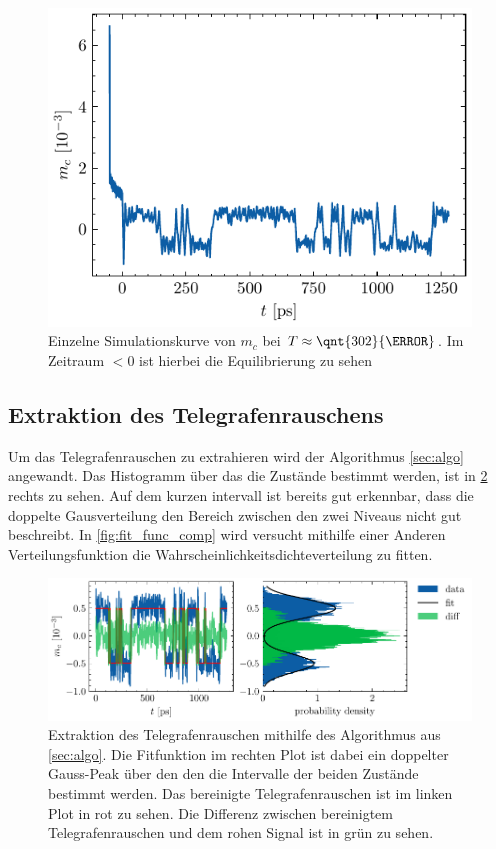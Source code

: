 \documentclass[main.tex]{subfiles}
\begin{document}
\begin{figure}[h]
    \centering
    \includegraphics{bilder/plots/theo-vis/example-telegraph-sim.pdf}
    \caption{Einzelne Simulationskurve von \(m_c\) bei \(T \approx \qnt{302}{\kelvin}\). Im Zeitraum \(<0\) ist hierbei die Equilibrierung zu sehen
    }\label{fig:bsp-run}
\end{figure}

\subsection{Extraktion des Telegrafenrauschens}

Um das Telegrafenrauschen zu extrahieren wird der Algorithmus \cref{sec:algo} angewandt.
Das Histogramm über das die Zustände bestimmt werden, ist in \cref{fig:extraktion-tgr} rechts zu sehen. Auf dem kurzen intervall ist bereits gut erkennbar, dass die doppelte Gausverteilung den Bereich zwischen den zwei Niveaus nicht gut beschreibt. In \cref{fig:fit_func_comp} wird versucht mithilfe einer Anderen Verteilungsfunktion die Wahrscheinlichkeitsdichteverteilung zu fitten.

\begin{figure}[H]
    \centering
    \includegraphics{bilder/plots/Bz_0mT/mc_fit_hist_part2_26.03meV.pdf}
    \caption{Extraktion des Telegrafenrauschen mithilfe des Algorithmus aus \cref{sec:algo}. Die Fitfunktion im rechten Plot ist dabei ein doppelter Gauss-Peak über den den die Intervalle der beiden Zustände bestimmt werden. Das bereinigte Telegrafenrauschen ist im linken Plot in rot zu sehen. Die Differenz zwischen bereinigtem Telegrafenrauschen und dem rohen Signal ist in grün zu sehen.}\label{fig:extraktion-tgr}
\end{figure}
\end{document}
